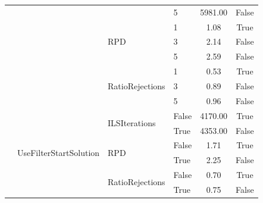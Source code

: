 \begin{table}[!ht]
\begin{tabular}{@{}l l l l c c @{}}
		                                      &                                              &                                     & 5                    & 5981.00         & False           \\\cmidrule(lr){3-6}
		                                      &                                              & \multirow[t]{3}{*}{RPD}             & 1                    & 1.08            & True            \\\cmidrule(lr){4-6}
		                                      &                                              &                                     & 3                    & 2.14            & False           \\\cmidrule(lr){4-6}
		                                      &                                              &                                     & 5                    & 2.59            & False           \\\cmidrule(lr){3-6}
		                                      &                                              & \multirow[t]{3}{*}{RatioRejections} & 1                    & 0.53            & True            \\\cmidrule(lr){4-6}
		                                      &                                              &                                     & 3                    & 0.89            & False           \\\cmidrule(lr){4-6}
		                                      &                                              &                                     & 5                    & 0.96            & False           \\\cmidrule(lr){2-6}
		                                      & \multirow[t]{6}{*}{UseFilterStartSolution}   & \multirow[t]{2}{*}{ILSIterations}   & False                & 4170.00         & True            \\\cmidrule(lr){4-6}
		                                      &                                              &                                     & True                 & 4353.00         & False           \\\cmidrule(lr){3-6}
		                                      &                                              & \multirow[t]{2}{*}{RPD}             & False                & 1.71            & True            \\\cmidrule(lr){4-6}
		                                      &                                              &                                     & True                 & 2.25            & False           \\\cmidrule(lr){3-6}
		                                      &                                              & \multirow[t]{2}{*}{RatioRejections} & False                & 0.70            & True            \\\cmidrule(lr){4-6}
		                                      &                                              &                                     & True                 & 0.75            & False           \\
	\end{tabular}


\end{table}
